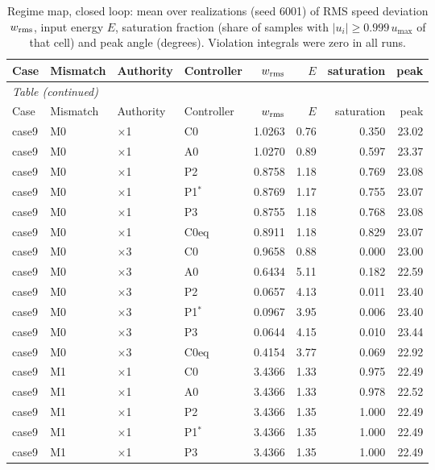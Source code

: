 {\small
\begin{longtable}{llllrrrr}
\caption{Regime map, closed loop: mean over realizations (seed 6001) of RMS speed deviation $w_{\rm rms}$, input energy $E$, saturation fraction (share of samples with $|u_i|\ge0.999\,u_{\max}$ of that cell) and peak angle (degrees). Violation integrals were zero in all runs.}\label{tab:S:regcl}\\
\toprule
Case & Mismatch & Authority & Controller & $w_{\rm rms}$ & $E$ & saturation & peak\\
\midrule
\endfirsthead
\multicolumn{8}{l}{\small\textit{Table \thetable{} (continued)}}\\
\toprule
Case & Mismatch & Authority & Controller & $w_{\rm rms}$ & $E$ & saturation & peak\\
\midrule
\endhead
\bottomrule
\endlastfoot
case9 & M0 & $\times$1 & C0 & 1.0263 & 0.76 & 0.350 & 23.02\\
case9 & M0 & $\times$1 & A0 & 1.0270 & 0.89 & 0.597 & 23.37\\
case9 & M0 & $\times$1 & P2 & 0.8758 & 1.18 & 0.769 & 23.08\\
case9 & M0 & $\times$1 & P1$^*$ & 0.8769 & 1.17 & 0.755 & 23.07\\
case9 & M0 & $\times$1 & P3 & 0.8755 & 1.18 & 0.768 & 23.08\\
case9 & M0 & $\times$1 & C0eq & 0.8911 & 1.18 & 0.829 & 23.07\\
case9 & M0 & $\times$3 & C0 & 0.9658 & 0.88 & 0.000 & 23.00\\
case9 & M0 & $\times$3 & A0 & 0.6434 & 5.11 & 0.182 & 22.59\\
case9 & M0 & $\times$3 & P2 & 0.0657 & 4.13 & 0.011 & 23.40\\
case9 & M0 & $\times$3 & P1$^*$ & 0.0967 & 3.95 & 0.006 & 23.40\\
case9 & M0 & $\times$3 & P3 & 0.0644 & 4.15 & 0.010 & 23.44\\
case9 & M0 & $\times$3 & C0eq & 0.4154 & 3.77 & 0.069 & 22.92\\
case9 & M1 & $\times$1 & C0 & 3.4366 & 1.33 & 0.975 & 22.49\\
case9 & M1 & $\times$1 & A0 & 3.4366 & 1.33 & 0.978 & 22.52\\
case9 & M1 & $\times$1 & P2 & 3.4366 & 1.35 & 1.000 & 22.49\\
case9 & M1 & $\times$1 & P1$^*$ & 3.4366 & 1.35 & 1.000 & 22.49\\
case9 & M1 & $\times$1 & P3 & 3.4366 & 1.35 & 1.000 & 22.49\\

\end{longtable}}
